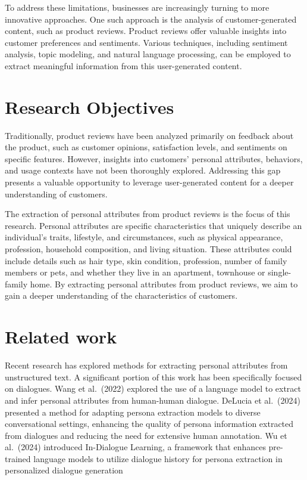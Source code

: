 \documentclass[
  letterpaper,
  a4paper,
  12pt,
  titlepage,
  oneside,
  openany]{book}
\begin{document}
To address these limitations, businesses are increasingly turning to
more innovative approaches. One such approach is the analysis of
customer-generated content, such as product reviews. Product reviews
offer valuable insights into customer preferences and sentiments.
Various techniques, including sentiment analysis, topic modeling, and
natural language processing, can be employed to extract meaningful
information from this user-generated content.

\hypertarget{research-objectives}{%
\section{Research Objectives}\label{research-objectives}}

Traditionally, product reviews have been analyzed primarily on feedback
about the product, such as customer opinions, satisfaction levels, and
sentiments on specific features. However, insights into customers'
personal attributes, behaviors, and usage contexts have not been
thoroughly explored. Addressing this gap presents a valuable opportunity
to leverage user-generated content for a deeper understanding of
customers.

The extraction of personal attributes from product reviews is the focus
of this research. Personal attributes are specific characteristics that
uniquely describe an individual's traits, lifestyle, and circumstances,
such as physical appearance, profession, household composition, and
living situation. These attributes could include details such as hair
type, skin condition, profession, number of family members or pets, and
whether they live in an apartment, townhouse or single-family home. By
extracting personal attributes from product reviews, we aim to gain a
deeper understanding of the characteristics of customers.

\hypertarget{related-work}{%
\section{Related work}\label{related-work}}

Recent research has explored methods for extracting personal attributes
from unstructured text. A significant portion of this work has been
specifically focused on dialogues. Wang et al.~(2022) explored the use
of a language model to extract and infer personal attributes from
human-human dialogue. DeLucia et al.~(2024) presented a method for
adapting persona extraction models to diverse conversational settings,
enhancing the quality of persona information extracted from dialogues
and reducing the need for extensive human annotation. Wu et al.~(2024)
introduced In-Dialogue Learning, a framework that enhances pre-trained
language models to utilize dialogue history for persona extraction in
personalized dialogue generation
\end{document}
